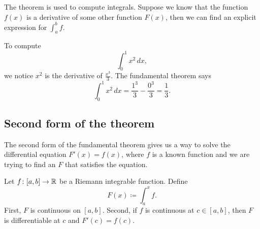 The theorem is used to compute integrals.  Suppose we know that
the function $f(x)$ is a derivative of some other function $F(x)$,
then we can find an explicit expression for $\int_a^b f$. 

\begin{example}
To compute
\begin{equation*}
\int_0^1 x^2 \,dx ,
\end{equation*}
we notice $x^2$ is the derivative of $\frac{x^3}{3}$.
The fundamental theorem says
\begin{equation*}
\int_0^1 x^2 \,dx =
\frac{1^3}{3}
-
\frac{0^3}{3}
= \frac{1}{3}.
\end{equation*}
\end{example}

\subsection{Second form of the theorem}

The second form of the fundamental theorem gives us a way to solve
the differential equation $F'(x) = f(x)$, where $f$ is a known
function and we are trying to find an $F$ that satisfies the equation.

\begin{thm} \label{thm:FTCv2}
Let $f \colon [a,b] \to {\mathbb{R}}$ be a Riemann integrable function.  Define
\begin{equation*}
F(x) \coloneqq \int_a^x f .
\end{equation*}
First, $F$ is continuous on $[a,b]$.  Second,
if $f$ is continuous at $c \in [a,b]$, then $F$ is differentiable at $c$
and $F'(c) = f(c)$.
\end{thm}

